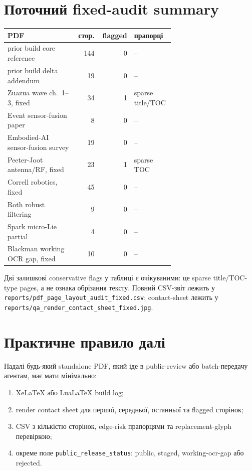 \section{Поточний fixed-audit summary}

\begin{longtable}{L{0.42\linewidth}r r L{0.24\linewidth}}
\toprule
PDF & стор. & flagged & прапорці \\
\midrule
\endhead
prior build core reference & 144 & 0 & -- \\
prior build delta addendum & 19 & 0 & -- \\
Zuazua wave ch.~1--3, fixed & 34 & 1 & sparse title/TOC \\
Event sensor-fusion paper & 8 & 0 & -- \\
Embodied-AI sensor-fusion survey & 19 & 0 & -- \\
Peeter-Joot antenna/RF, fixed & 23 & 1 & sparse TOC \\
Correll robotics, fixed & 45 & 0 & -- \\
Roth robust filtering & 9 & 0 & -- \\
Spark micro-Lie partial & 4 & 0 & -- \\
Blackman working OCR gap, fixed & 10 & 0 & -- \\
\bottomrule
\end{longtable}

Дві залишкові conservative flags у таблиці є очікуваними: це sparse title/TOC-type pages, а не ознака обрізання тексту. Повний CSV-звіт лежить у \texttt{reports/pdf\_page\_layout\_audit\_fixed.csv}; contact-sheet лежить у \texttt{reports/qa\_render\_contact\_sheet\_fixed.jpg}.

\section{Практичне правило далі}
Надалі будь-який standalone PDF, який іде в public-review або batch-передачу агентам, має мати мінімально:
\begin{enumerate}
\item XeLaTeX або LuaLaTeX build log;
\item render contact sheet для першої, середньої, останньої та flagged сторінок;
\item CSV з кількістю сторінок, edge-risk прапорцями та replacement-glyph перевіркою;
\item окреме поле \texttt{public\_release\_status}: public, staged, working-ocr-gap або rejected.
\end{enumerate}



